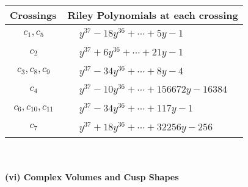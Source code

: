 \documentclass[1p]{elsarticle_modified}
\theoremstyle{definition}
\begin{document}
\begin{tabular}{m{50pt}|m{274pt}}
Crossings & \hspace{64pt}Riley Polynomials at each crossing \\
\hline $$\begin{aligned}c_{1},c_{5}\end{aligned}$$&$\begin{aligned}
&y^{37}-18 y^{36}+\cdots+5 y-1
\end{aligned}$\\
\hline $$\begin{aligned}c_{2}\end{aligned}$$&$\begin{aligned}
&y^{37}+6 y^{36}+\cdots+21 y-1
\end{aligned}$\\
\hline $$\begin{aligned}c_{3},c_{8},c_{9}\end{aligned}$$&$\begin{aligned}
&y^{37}-34 y^{36}+\cdots+8 y-4
\end{aligned}$\\
\hline $$\begin{aligned}c_{4}\end{aligned}$$&$\begin{aligned}
&y^{37}-10 y^{36}+\cdots+156672 y-16384
\end{aligned}$\\
\hline $$\begin{aligned}c_{6},c_{10},c_{11}\end{aligned}$$&$\begin{aligned}
&y^{37}-34 y^{36}+\cdots+117 y-1
\end{aligned}$\\
\hline $$\begin{aligned}c_{7}\end{aligned}$$&$\begin{aligned}
&y^{37}+18 y^{36}+\cdots+32256 y-256
\end{aligned}$\\
\hline
\end{tabular}\\~\\
\newpage\flushleft \textbf{(vi) Complex Volumes and Cusp Shapes}
\end{document}
